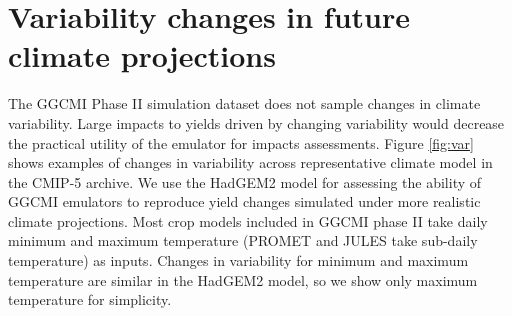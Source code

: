 \documentclass[12pt]{article}
\begin{document}
\clearpage
\section{Variability changes in future climate projections}
\begin{flushleft}
The GGCMI Phase II simulation dataset does not sample changes in climate variability. Large impacts to yields driven by changing variability would decrease the practical utility of the emulator for impacts assessments.
Figure \ref{fig:var} shows examples of changes in variability across representative climate model in the CMIP-5 archive. 
We use the HadGEM2 model for assessing the ability of GGCMI emulators to reproduce yield changes simulated under more realistic climate projections.
Most crop models included in GGCMI phase II take daily minimum and maximum temperature (PROMET and JULES take sub-daily temperature) as inputs. 
Changes in variability for minimum and maximum temperature are similar in the HadGEM2 model, so we show only maximum temperature for simplicity. 
\end{flushleft}
\end{document}
